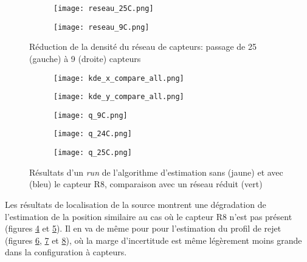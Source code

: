 \begin{figure}[h!]
	\centering
	\begin{subfigure}[t]{0.5\textwidth}
		\centering
		\texttt{[image: reseau\_25C.png]}
		\caption{}
		\label{reseau_25C}
	\end{subfigure}%
	\begin{subfigure}[t]{0.5\textwidth}
		\centering
		\texttt{[image: reseau\_9C.png]}
		\caption{}
		\label{reseau_9C}
	\end{subfigure}
	\caption{Réduction de la densité du réseau de capteurs: passage de 25 (gauche) à 9 (droite) capteurs}
	\label{fig_reseaux_25_9}
\end{figure}


\begin{figure}[h!]
	\centering
	\begin{subfigure}[t]{0.5\textwidth}
		\centering
		\texttt{[image: kde\_x\_compare\_all.png]}
		\caption{}
		\label{kde_x_all}
	\end{subfigure}%
	\begin{subfigure}[t]{0.5\textwidth}
		\centering
		\texttt{[image: kde\_y\_compare\_all.png]}
		\caption{}
		\label{kde_y_all}
	\end{subfigure}
	\begin{subfigure}[t]{0.33\textwidth}
		\centering
		\texttt{[image: q\_9C.png]}
		\caption{}
		\label{q_9C}
	\end{subfigure}%
	\begin{subfigure}[t]{0.33\textwidth}
		\centering
		\texttt{[image: q\_24C.png]}
		\caption{}
		\label{q_24C}
	\end{subfigure}%
	\begin{subfigure}[t]{0.33\textwidth}
		\centering
		\texttt{[image: q\_25C.png]}
		\caption{}
		\label{q_25C}
	\end{subfigure}
	\caption{Résultats d'un \textit{run} de l'algorithme d'estimation sans (jaune) et avec (bleu) le capteur R8, comparaison avec un réseau réduit (vert)}
	\label{}
\end{figure}



Les résultats de  localisation de la source montrent une dégradation de l'estimation de la position similaire au cas où le capteur R8 n'est pas présent (figures \ref{kde_x_all} et \ref{kde_y_all}). Il en va de même pour pour l'estimation du profil de rejet (figures \ref{q_9C}, \ref{q_24C} et \ref{q_25C}), où la marge d'incertitude est même légèrement moins grande dans la configuration à capteurs. 

